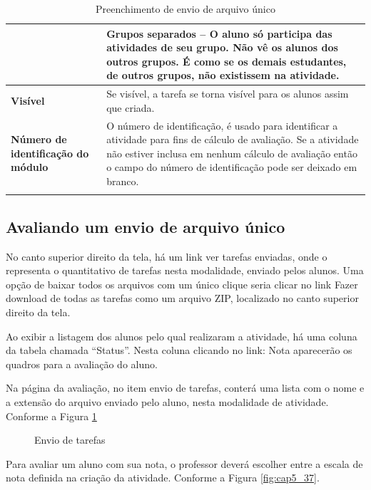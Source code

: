 \begin{longtable}{p{6cm}|p{9cm}}
&\textbf{Grupos separados –} O aluno só participa das atividades de seu grupo. Não vê os alunos dos outros grupos. É como se os demais estudantes, de outros grupos, não existissem na atividade.
 \\\hline
    \textbf{Visível} &Se visível, a tarefa se torna visível para os alunos assim que criada. \\\hline
    \textbf{Número de identificação do módulo} & O número de identificação, é usado para identificar a atividade para fins de cálculo de avaliação. Se a atividade não estiver inclusa em nenhum cálculo de avaliação então o campo do número de identificação pode ser deixado em branco.\\\hline
\caption{Preenchimento de envio de arquivo único}
\end{longtable}%

\subsection{Avaliando um envio de arquivo único}
No canto superior direito da tela, há um link ver tarefas enviadas, onde o   representa o quantitativo de tarefas nesta modalidade, enviado pelos alunos. Uma opção de baixar todos os arquivos com um único clique seria clicar no link Fazer download de todas as tarefas como um arquivo ZIP, localizado no canto superior direito da tela.

Ao exibir a listagem dos alunos pelo qual realizaram a atividade, há uma coluna da tabela chamada “Status”. Nesta coluna clicando no link: Nota aparecerão os quadros para a avaliação do aluno.

Na página da avaliação, no item envio de tarefas, conterá uma lista com o nome e a extensão do arquivo enviado pelo aluno, nesta modalidade de atividade. Conforme a Figura \ref{fig:cap5_36}

\begin{figure}[!htbp]
 \begin{center}
\caption{Envio de tarefas}
  \label{fig:cap5_36}
 \end{center}
\end{figure}

Para avaliar um aluno com sua nota, o professor deverá escolher entre a escala de nota definida na criação da atividade. Conforme a Figura \ref{fig:cap5_37}.

